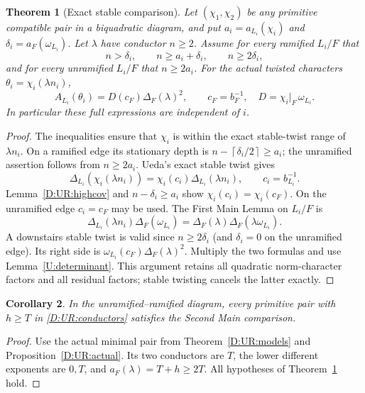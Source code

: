 \documentclass[11pt]{amsart}
\newtheorem{theorem}{Theorem}[section]
\newtheorem{corollary}[theorem]{Corollary}
\theoremstyle{definition}
\theoremstyle{remark}
\newcommand{\ceil}[1]{\left\lceil #1\right\rceil}
\begin{document}
\begin{theorem}[Exact stable comparison]\label{D:UR:stable}
Let $(\chi_1,\chi_2)$ be any primitive compatible pair in a biquadratic
diagram, and put $a_i=a_{L_i}(\chi_i)$ and
$\delta_i=a_F(\omega_{L_i})$. Let $\lambda$ have conductor $n\ge2$.
Assume for every ramified $L_i/F$ that
\[
 n>\delta_i,\qquad n\ge a_i+\delta_i,\qquad n\ge2\delta_i,
\]
and for every unramified $L_i/F$ that $n\ge2a_i$.
For the actual twisted characters $\theta_i=\chi_i(\lambda n_i)$,
\begin{equation}\label{D:UR:stableidentity}
 A_{L_i}(\theta_i)=D(c_F)\Delta_F(\lambda)^2,
 \qquad c_F=b_F^{-1},\quad D=\chi_i|_F\,\omega_{L_i}.
\end{equation}
In particular these full expressions are independent of $i$.
\end{theorem}
\begin{proof}
The inequalities ensure that $\chi_i$ is within the exact stable-twist
range of $\lambda n_i$. On a ramified edge its stationary depth is
$n-\ceil{\delta_i/2}\ge a_i$; the unramified assertion follows from
$n\ge2a_i$. Ueda's exact stable twist gives
\[
 \Delta_{L_i}(\chi_i(\lambda n_i))
 =\chi_i(c_i)\Delta_{L_i}(\lambda n_i),\qquad c_i=b_{L_i}^{-1}.
\]
Lemma~\ref{D:UR:highcov} and $n-\delta_i\ge a_i$ show
$\chi_i(c_i)=\chi_i(c_F)$. On the unramified edge $c_i=c_F$ may be used.
The First Main Lemma on $L_i/F$ is
\[
 \Delta_{L_i}(\lambda n_i)\Delta_F(\omega_{L_i})
 =\Delta_F(\lambda)\Delta_F(\lambda\omega_{L_i}).
\]
A downstairs stable twist is valid since $n\ge2\delta_i$ (and
$\delta_i=0$ on the unramified edge). Its right side is
$\omega_{L_i}(c_F)\Delta_F(\lambda)^2$.
Multiply the two formulas and use Lemma~\ref{U:determinant}.
This argument retains all quadratic norm-character factors and all
residual factors; stable twisting cancels the latter exactly.
\end{proof}
\begin{corollary}\label{D:UR:URstable}
In the unramified--ramified diagram, every primitive pair with $h\ge T$
in \eqref{D:UR:conductors} satisfies the Second Main comparison.
\end{corollary}
\begin{proof}
Use the actual minimal pair from Theorem~\ref{D:UR:models} and
Proposition~\ref{D:UR:actual}. Its two conductors are $T$, the lower different
exponents are $0,T$, and $a_F(\lambda)=T+h\ge2T$.
All hypotheses of Theorem~\ref{D:UR:stable} hold.
\end{proof}
\end{document}

